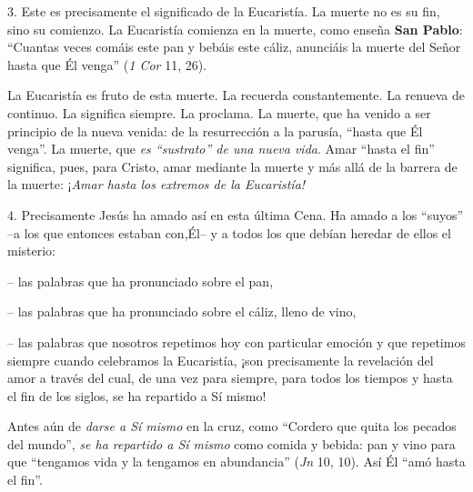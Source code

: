 			\begin{body}3. Este es precisamente el significado de la Eucaristía. La muerte no es su fin, sino su comienzo. La Eucaristía comienza en la muerte, como enseña \textbf{San Pablo}: “Cuantas veces comáis este pan y bebáis este cáliz, anunciáis la muerte del Señor hasta que Él venga” (\textit{1 Cor }11, 26).\end{body}
			
			\begin{body}La Eucaristía es fruto de esta muerte. La recuerda constantemente. La renueva de continuo. La significa siempre. La proclama. La muerte, que ha venido a ser principio de la nueva venida: de la resurrección a la parusía, “hasta que Él venga”. La muerte, que \textit{es “sustrato” de una nueva vida}. Amar “hasta el fin” significa, pues, para Cristo, amar mediante la muerte y más allá de la barrera de la muerte: ¡\textit{Amar hasta los extremos de la Eucaristía!}\end{body}
			
			\begin{body}4. Precisamente Jesús ha amado así en esta última Cena. Ha amado a los “suyos” –a los que entonces estaban con,Él– y a todos los que debían heredar de ellos el misterio:\end{body}
			
			\begin{body}– las palabras que ha pronunciado sobre el pan,\end{body}
			
			\begin{body}– las palabras que ha pronunciado sobre el cáliz, lleno de vino,\end{body}
			
			\begin{body}– las palabras que nosotros repetimos hoy con particular emoción y que repetimos siempre cuando celebramos la Eucaristía, ¡son precisamente la revelación del amor a través del cual, de una vez para siempre, para todos los tiempos y hasta el fin de los siglos, se ha repartido a Sí mismo!\end{body}
			
			\begin{body}Antes aún de \textit{darse a Sí mismo} en la cruz, como “Cordero que quita los pecados del mundo”, \textit{se ha repartido a Sí mismo} como comida y bebida: pan y vino para que “tengamos vida y la tengamos en abundancia” (\textit{Jn} 10, 10). Así Él “amó hasta el fin”.\end{body}
			
